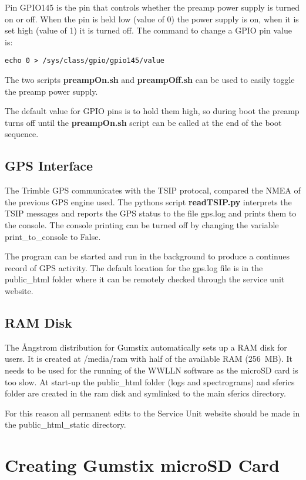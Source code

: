 Pin GPIO145 is the pin that controls whether the preamp power supply is turned on or off.
When the pin is held low (value of 0) the power supply is on, when it is set high (value of 1) it is turned off.
The command to change a GPIO pin value is:

\begin{verbatim}
echo 0 > /sys/class/gpio/gpio145/value
\end{verbatim}

The two scripts {\bf preampOn.sh} and {\bf preampOff.sh} can be used to easily toggle the preamp power supply.

The default value for GPIO pins is to hold them high, so during boot the preamp turns off until the {\bf preampOn.sh} script can be called at the end of the boot sequence.

\subsection{GPS Interface}

The Trimble GPS communicates with the TSIP protocal, compared the NMEA of the previous GPS engine used.
The pythons script {\bf readTSIP.py} interprets the TSIP messages and reports the GPS status to the file gps.log and prints them to the console.
The console printing can be turned off by changing the variable print\_to\_console to False.

The program can be started and run in the background to produce a continues record of GPS activity.
The default location for the gps.log file is in the public\_html folder where it can be remotely checked through the service unit website.

\subsection{RAM Disk}

The \r{A}ngstrom distribution for Gumstix automatically sets up a RAM disk for users.
It is created at /media/ram with half of the available RAM (256~MB).
It needs to be used for the running of the WWLLN software as the microSD card is too slow.
At start-up the public\_html folder (logs and spectrograms) and sferics folder are created in the ram disk and symlinked to the main sferics directory.

For this reason all permanent edits to the Service Unit website should be made in the public\_html\_static directory.

\section{Creating Gumstix microSD Card}



